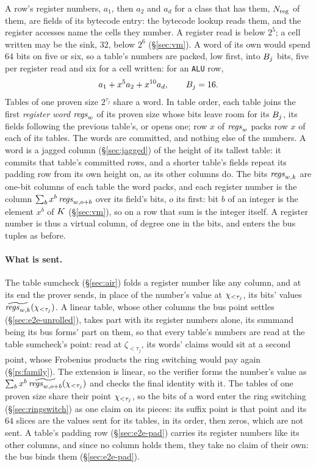 A row's register numbers, $a_1$, then $a_2$ and $a_d$ for a class that has them, $N_{\mathrm{reg}}$ of them, are fields of its bytecode entry: the bytecode lookup reads them, and the register accesses name the cells they number. A register read is below $2^{5}$; a cell written may be the sink, $32$, below $2^{6}$ (\S\ref{sec:vm}). A word of its own would spend $64$ bits on five or six, so a table's numbers are packed, low first, into $B_{j}$ bits, five per register read and six for a cell written: for an \texttt{ALU} row,
\[
  a_1+x^{5}a_2+x^{10}a_d,\qquad B_{j}=16.
\]
Tables of one proven size $2^{\tau_j}$ share a word. In table order, each table joins the first \emph{register word} $\mathit{regs}_{w}$ of its proven size whose bits leave room for its $B_{j}$, its fields following the previous table's, or opens one; row $x$ of $\mathit{regs}_{w}$ packs row $x$ of each of its tables. The words are committed, and nothing else of the numbers. A word is a jagged column (\S\ref{sec:jagged}) of the height of its tallest table: it commits that table's committed rows, and a shorter table's fields repeat its padding row from its own height on, as its other columns do. The bits $\mathit{regs}_{w,k}$ are one-bit columns of each table the word packs, and each register number is the column $\sum_{b}x^{b}\,\mathit{regs}_{w,o+b}$ over its field's bits, $o$ its first: bit $b$ of an integer is the element $x^{b}$ of $K$ (\S\ref{sec:vm}), so on a row that sum is the integer itself. A register number is thus a virtual column, of degree one in the bits, and enters the bus tuples as before.

\paragraph{What is sent.} The table sumcheck (\S\ref{sec:air}) folds a register number like any column, and at its end the prover sends, in place of the number's value at $\chi_{<\tau_j}$, its bits' values $\widetilde{\mathit{regs}_{w,k}}(\chi_{<\tau_j})$. A linear table, whose other columns the bus point settles (\S\ref{sec:e2e-unrolled}), takes part with its register numbers alone, its summand being its bus forms' part on them, so that every table's numbers are read at the table sumcheck's point: read at $\zeta_{<\tau_j}$, its words' claims would sit at a second point, whose Frobenius products the ring switching would pay again (\S\ref{rs:family}). The extension is linear, so the verifier forms the number's value as $\sum_bx^{b}\,\widetilde{\mathit{regs}_{w,o+b}}(\chi_{<\tau_j})$ and checks the final identity with it. The tables of one proven size share their point $\chi_{<\tau_j}$, so the bits of a word enter the ring switching (\S\ref{sec:ringswitch}) as one claim on its pieces: its suffix point is that point and its $64$ slices are the values sent for its tables, in its order, then zeros, which are not sent. A table's padding row (\S\ref{sec:e2e-pad}) carries its register numbers like its other columns, and since no column holds them, they take no claim of their own: the bus binds them (\S\ref{sec:e2e-pad}).

